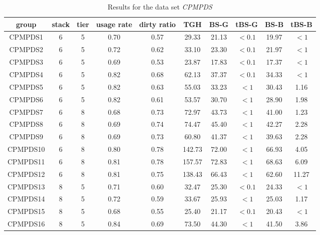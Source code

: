 \documentclass[review,3p,times,authoryear,12pt]{elsarticle}
\begin{document}
\begin{table}[htbp]

\caption{\label{tab:cpmpds} Results for the data set {\em CPMPDS}}
\footnotesize
\centering
\begin{tabular}{c|c|c|c|c|c|c|c|c|c}

    \hline
    group & stack & tier  & usage rate & dirty ratio & TGH   & BS-G  & tBS-G & BS-B  & tBS-B \\
    \hline
    CPMPDS1 & 6      & 5     & 0.70  & 0.57  & 29.33   & 21.13  & $<0.1$  & 19.97  & $<1$ \\
    CPMPDS2 & 6      & 5     & 0.72  & 0.62  & 33.10   & 23.30  & $<0.1$  & 21.97  & $<1$ \\
    CPMPDS3 & 6      & 5     & 0.69  & 0.53  & 23.87   & 17.83  & $<0.1$  & 17.37  & $<1$\\
    CPMPDS4 & 6      & 5     & 0.82  & 0.68  & 62.13   & 37.37  & $<0.1$  & 34.33  & $<1$ \\
    CPMPDS5 & 6      & 5     & 0.82  & 0.63  & 55.03   & 33.23  & $<1$    & 30.43  & 1.16  \\
    CPMPDS6 & 6      & 5     & 0.82  & 0.61  & 53.57   & 30.70  & $<1$    & 28.90  & 1.98  \\
    CPMPDS7 & 6      & 8     & 0.68  & 0.73  & 72.97   & 43.73  & $<1$    & 41.00  & 1.23  \\
    CPMPDS8 & 6      & 8     & 0.69  & 0.74  & 74.47   & 45.40  & $<1$    & 42.27  & 2.28  \\
    CPMPDS9 & 6      & 8     & 0.69  & 0.73  & 60.80   & 41.37  & $<1$    & 39.63  & 2.28  \\
    CPMPDS10 & 6     & 8     & 0.80  & 0.78  & 142.73  & 72.00  & $<1$    & 66.93  & 4.05  \\
    CPMPDS11 & 6     & 8     & 0.81  & 0.78  & 157.57  & 72.83  & $<1$    & 68.63  & 6.09  \\
    CPMPDS12 & 6     & 8     & 0.81  & 0.75  & 138.43  & 66.43  & $<1$    & 62.60  & 11.27  \\
    CPMPDS13 & 8     & 5     & 0.71  & 0.60  & 32.47   & 25.30  & $<0.1$  & 24.33  & $<1$ \\
    CPMPDS14 & 8     & 5     & 0.72  & 0.59  & 33.67   & 25.93  & $<1$    & 25.03  & 1.17  \\
    CPMPDS15 & 8     & 5     & 0.68  & 0.55  & 25.40   & 21.17  & $<0.1$  & 20.43  & $<1$ \\
    CPMPDS16 & 8     & 5     & 0.84  & 0.69  & 73.50   & 44.30  & $<1$    & 41.50  & 3.86  \\

\end{tabular}
\end{table}
\end{document}
